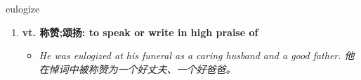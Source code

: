 
\begin{frame}
{\huge eulogize}
\begin{center}
\begin{enumerate}\Large
  \item \textbf{vt. 称赞;颂扬: to speak or write in high praise of}
  \begin{itemize}
    \item \em{\Large{He was eulogized at his funeral as a caring husband and a good father. 他在悼词中被称赞为一个好丈夫、一个好爸爸。}}
  \end{itemize}
\end{enumerate}
\end{center}
\end{frame}
